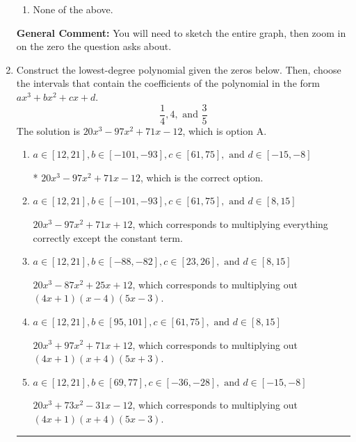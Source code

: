 \documentclass{extbook}[14pt]
\newcommand{\litem}[1]{\item #1

\rule{\textwidth}{0.4pt}}
\begin{document}
\begin{enumerate}
{\begin{enumerate}[label=\Alph*.]
\item None of the above.\end{enumerate}
\textbf{General Comment:} You will need to sketch the entire graph, then zoom in on the zero the question asks about.
}
\litem{
Construct the lowest-degree polynomial given the zeros below. Then, choose the intervals that contain the coefficients of the polynomial in the form $ax^3+bx^2+cx+d$.
\[ \frac{1}{4}, 4, \text{ and } \frac{3}{5} \]The solution is \( 20x^{3} -97 x^{2} +71 x -12 \), which is option A.\begin{enumerate}[label=\Alph*.]
\item \( a \in [12, 21], b \in [-101, -93], c \in [61, 75], \text{ and } d \in [-15, -8] \)

* $20x^{3} -97 x^{2} +71 x -12$, which is the correct option.
\item \( a \in [12, 21], b \in [-101, -93], c \in [61, 75], \text{ and } d \in [8, 15] \)

$20x^{3} -97 x^{2} +71 x + 12$, which corresponds to multiplying everything correctly except the constant term.
\item \( a \in [12, 21], b \in [-88, -82], c \in [23, 26], \text{ and } d \in [8, 15] \)

$20x^{3} -87 x^{2} +25 x + 12$, which corresponds to multiplying out $(4x + 1)(x -4)(5x -3)$.
\item \( a \in [12, 21], b \in [95, 101], c \in [61, 75], \text{ and } d \in [8, 15] \)

$20x^{3} +97 x^{2} +71 x + 12$, which corresponds to multiplying out $(4x + 1)(x + 4)(5x + 3)$.
\item \( a \in [12, 21], b \in [69, 77], c \in [-36, -28], \text{ and } d \in [-15, -8] \)

$20x^{3} +73 x^{2} -31 x -12$, which corresponds to multiplying out $(4x + 1)(x + 4)(5x -3)$.
\end{enumerate}

}
\end{enumerate}
\end{document}

